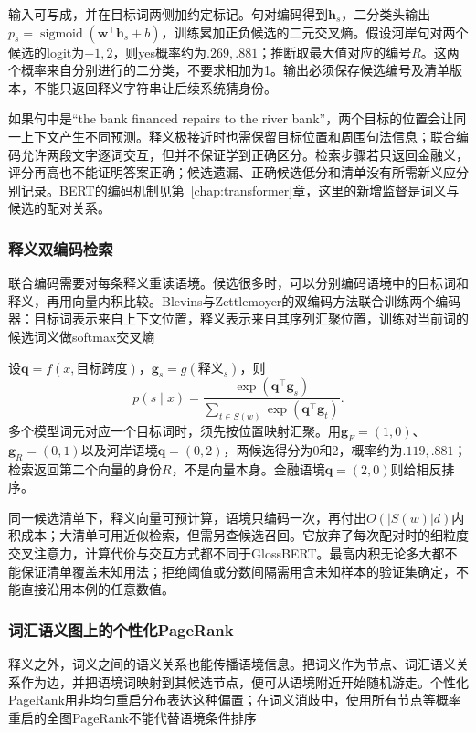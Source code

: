 输入可写成，并在目标词两侧加约定标记。句对编码得到$\bm h_s$，二分类头输出$p_s=\operatorname{sigmoid}(\bm w^\top\bm h_s+b)$，训练累加正负候选的二元交叉熵。假设河岸句对两个候选的logit为$-1,2$，则yes概率约为$.269,.881$；推断取最大值对应的编号$R$。这两个概率来自分别进行的二分类，不要求相加为1。输出必须保存候选编号及清单版本，不能只返回释义字符串让后续系统猜身份。

如果句中是“the bank financed repairs to the river bank”，两个目标的位置会让同一上下文产生不同预测。释义极接近时也需保留目标位置和周围句法信息；联合编码允许两段文字逐词交互，但并不保证学到正确区分。检索步骤若只返回金融义，评分再高也不能证明答案正确；候选遗漏、正确候选低分和清单没有所需新义应分别记录。BERT的编码机制见第~\ref{chap:transformer}章，这里的新增监督是词义与候选的配对关系。

\subsubsection{释义双编码检索}
\label{sec:nlp-analysis-gloss-retrieval}

联合编码需要对每条释义重读语境。候选很多时，可以分别编码语境中的目标词和释义，再用向量内积比较。Blevins与Zettlemoyer的双编码方法联合训练两个编码器：目标词表示来自上下文位置，释义表示来自其序列汇聚位置，训练对当前词的候选词义做softmax交叉熵

设$\bm q=f(x,\text{目标跨度})$，$\bm g_s=g(\text{释义}_s)$，则
\[
 p(s\mid x)=\frac{\exp(\bm q^\top\bm g_s)}
                  {\sum_{t\in S(w)}\exp(\bm q^\top\bm g_t)}.
\]
多个模型词元对应一个目标词时，须先按位置映射汇聚。用$\bm g_F=(1,0)$、$\bm g_R=(0,1)$以及河岸语境$\bm q=(0,2)$，两候选得分为0和2，概率约为$.119,.881$；检索返回第二个向量的身份$R$，不是向量本身。金融语境$\bm q=(2,0)$则给相反排序。

同一候选清单下，释义向量可预计算，语境只编码一次，再付出$O(|S(w)|d)$内积成本；大清单可用近似检索，但需另查候选召回。它放弃了每次配对时的细粒度交叉注意力，计算代价与交互方式都不同于GlossBERT。最高内积无论多大都不能保证清单覆盖未知用法；拒绝阈值或分数间隔需用含未知样本的验证集确定，不能直接沿用本例的任意数值。

\subsubsection{词汇语义图上的个性化PageRank}
\label{sec:nlp-analysis-wsd-ppr}

释义之外，词义之间的语义关系也能传播语境信息。把词义作为节点、词汇语义关系作为边，并把语境词映射到其候选节点，便可从语境附近开始随机游走。个性化PageRank用非均匀重启分布表达这种偏置；在词义消歧中，使用所有节点等概率重启的全图PageRank不能代替语境条件排序

